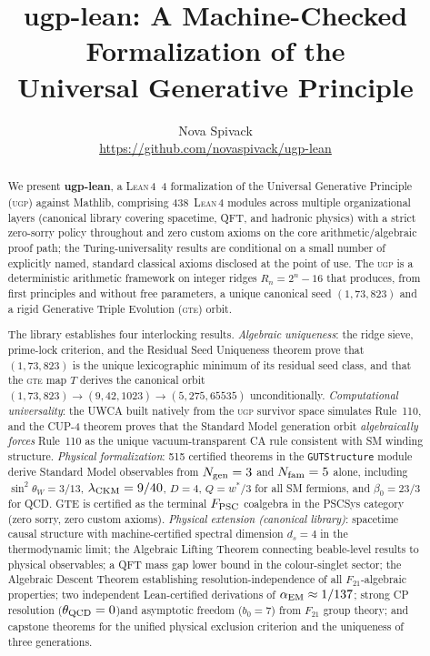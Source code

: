 \documentclass[11pt,a4paper]{article}
\title{\textbf{ugp-lean}: A Machine-Checked Formalization of the\\
       Universal Generative Principle}
\author{Nova Spivack\\[2pt]
  {\small\sloppy\url{https://github.com/novaspivack/ugp-lean}}}
\date{}
\theoremstyle{definition}
\newcommand{\ugp}{\textsc{ugp}}
\newcommand{\gte}{\textsc{gte}}
\newcommand{\lean}{\textsc{Lean}\,4}
\begin{document}
\maketitle
\NovaZenodoAfterTitle


\begin{abstract}
We present \textbf{ugp-lean}, a \lean{}~4 formalization of the
Universal Generative Principle (\ugp{}) against Mathlib, comprising
438~\lean{} modules across multiple organizational layers (canonical library covering
spacetime, QFT, and hadronic physics) with a strict zero-sorry policy throughout
and zero custom axioms on the core arithmetic/algebraic proof path; the
Turing-universality results are conditional on a small number of explicitly named,
standard classical axioms disclosed at the point of use.
The \ugp{} is a deterministic arithmetic framework on integer ridges
$R_n = 2^n - 16$ that produces, from first principles and without free
parameters, a unique canonical seed $(1,73,823)$ and a rigid
Generative Triple Evolution (\gte{}) orbit.

The library establishes four interlocking results.
\emph{Algebraic uniqueness}: the ridge sieve, prime-lock criterion, and
the Residual Seed Uniqueness theorem prove that $(1,73,823)$ is the
unique lexicographic minimum of its residual seed class, and that the
\gte{} map $T$ derives the canonical orbit
$(1,73,823)\to(9,42,1023)\to(5,275,65535)$ unconditionally.
\emph{Computational universality}: the UWCA built natively from the
\ugp{} survivor space simulates Rule~110, and the CUP-4 theorem proves
that the Standard Model generation orbit \emph{algebraically forces}
Rule~110 as the unique vacuum-transparent CA rule consistent with SM
winding structure.
\emph{Physical formalization}: 515 certified theorems in the
\texttt{GUTStructure} module derive Standard Model observables from
$N_{\rm gen}=3$ and $N_{\rm fam}=5$ alone, including
$\sin^2\theta_W = 3/13$, $\lambda_{\rm CKM} = 9/40$, $D=4$,
$Q = w^*/3$ for all SM fermions, and $\beta_0 = 23/3$ for QCD.
GTE is certified as the terminal $F_{\rm PSC}$ coalgebra in the PSCSys
category (zero sorry, zero custom axioms).
\emph{Physical extension (canonical library)}: spacetime causal structure
with machine-certified spectral dimension $d_s = 4$ in the thermodynamic
limit; the Algebraic Lifting Theorem connecting beable-level results to
physical observables; a QFT mass gap lower bound in the colour-singlet
sector; the Algebraic Descent Theorem establishing resolution-independence
of all $F_{21}$-algebraic properties; two independent Lean-certified
derivations of $\alpha_{\rm EM} \approx 1/137$; strong CP resolution
($\theta_{\rm QCD}=0$)\linebreak[2] and asymptotic freedom ($b_0=7$) from $F_{21}$
group theory; and capstone theorems for the unified physical exclusion
criterion and the uniqueness of three generations.


\end{abstract}
\end{document}
